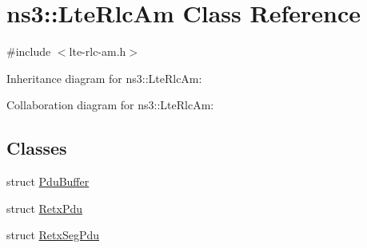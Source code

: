\hypertarget{classns3_1_1LteRlcAm}{}\section{ns3\+:\+:Lte\+Rlc\+Am Class Reference}
\label{classns3_1_1LteRlcAm}


{\ttfamily \#include $<$lte-\/rlc-\/am.\+h$>$}



Inheritance diagram for ns3\+:\+:Lte\+Rlc\+Am\+:


Collaboration diagram for ns3\+:\+:Lte\+Rlc\+Am\+:
\subsection*{Classes}
\begin{DoxyCompactItemize}
\item 
struct \hyperlink{structns3_1_1LteRlcAm_1_1PduBuffer}{Pdu\+Buffer}
\item 
struct \hyperlink{structns3_1_1LteRlcAm_1_1RetxPdu}{Retx\+Pdu}
\item 
struct \hyperlink{structns3_1_1LteRlcAm_1_1RetxSegPdu}{Retx\+Seg\+Pdu}
\end{DoxyCompactItemize}
